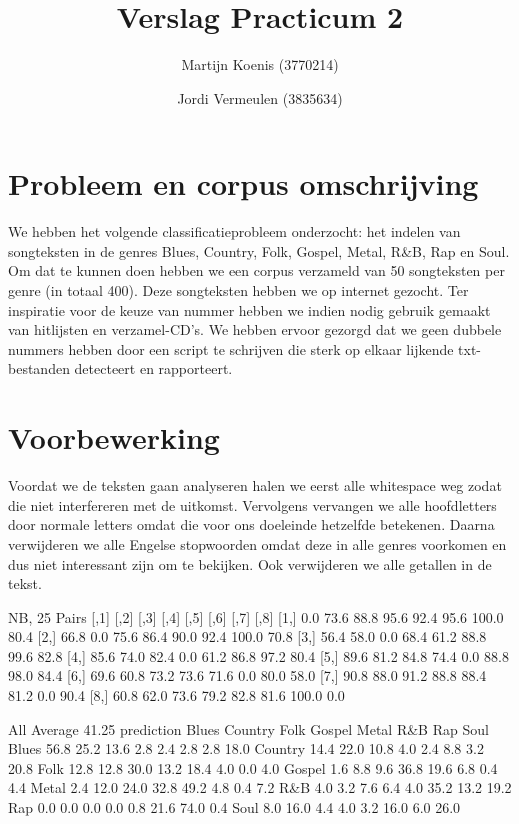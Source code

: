 \documentclass[a4paper,oneside]{article}
\begin{document}
\title{Verslag Practicum 2}
\author{Martijn Koenis (3770214) \and Jordi Vermeulen (3835634)}
\date{}
\maketitle


\begin{abstract}
\end{abstract}


\section{Probleem en corpus omschrijving}
We hebben het volgende classificatieprobleem onderzocht: het indelen van songteksten in de genres Blues, Country, Folk, Gospel, Metal, R\&B, Rap en Soul.  Om dat te kunnen doen hebben we een corpus verzameld van 50 songteksten per genre (in totaal 400). Deze songteksten hebben we op internet gezocht. Ter inspiratie voor de keuze van nummer hebben we indien nodig gebruik gemaakt van hitlijsten en verzamel-CD's. We hebben ervoor gezorgd dat we geen dubbele nummers hebben door een script te schrijven die sterk op elkaar lijkende txt-bestanden detecteert en rapporteert.

\section{Voorbewerking}
Voordat we de teksten gaan analyseren halen we eerst alle whitespace weg zodat die niet interfereren met de uitkomst. Vervolgens vervangen we alle hoofdletters door normale letters omdat die voor ons doeleinde hetzelfde betekenen. Daarna verwijderen we alle Engelse stopwoorden omdat deze in alle genres voorkomen en dus niet interessant zijn om te bekijken. Ook verwijderen we alle getallen in de tekst.

NB, 25
Pairs
     [,1] [,2] [,3] [,4] [,5] [,6]  [,7] [,8]
[1,]  0.0 73.6 88.8 95.6 92.4 95.6 100.0 80.4
[2,] 66.8  0.0 75.6 86.4 90.0 92.4 100.0 70.8
[3,] 56.4 58.0  0.0 68.4 61.2 88.8  99.6 82.8
[4,] 85.6 74.0 82.4  0.0 61.2 86.8  97.2 80.4
[5,] 89.6 81.2 84.8 74.4  0.0 88.8  98.0 84.4
[6,] 69.6 60.8 73.2 73.6 71.6  0.0  80.0 58.0
[7,] 90.8 88.0 91.2 88.8 88.4 81.2   0.0 90.4
[8,] 60.8 62.0 73.6 79.2 82.8 81.6 100.0  0.0

All
Average 41.25
prediction Blues Country Folk Gospel Metal  R\&B  Rap Soul
   Blues    56.8    25.2 13.6    2.8   2.4  2.8  2.8 18.0
   Country  14.4    22.0 10.8    4.0   2.4  8.8  3.2 20.8
   Folk     12.8    12.8 30.0   13.2  18.4  4.0  0.0  4.0
   Gospel    1.6     8.8  9.6   36.8  19.6  6.8  0.4  4.4
   Metal     2.4    12.0 24.0   32.8  49.2  4.8  0.4  7.2
   R\&B       4.0     3.2  7.6    6.4   4.0 35.2 13.2 19.2
   Rap       0.0     0.0  0.0    0.0   0.8 21.6 74.0  0.4
   Soul      8.0    16.0  4.4    4.0   3.2 16.0  6.0 26.0
\end{document}
